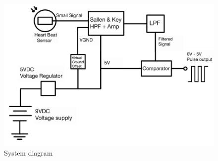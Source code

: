 \begin{figure}[ht]
    \centering
    \includegraphics[width = 0.8\linewidth]{Figures/SysDiagram.png}
    \caption[System Block Diagram]{System diagram}
    \label{fig:system_diagram}
\end{figure}

\vfill









